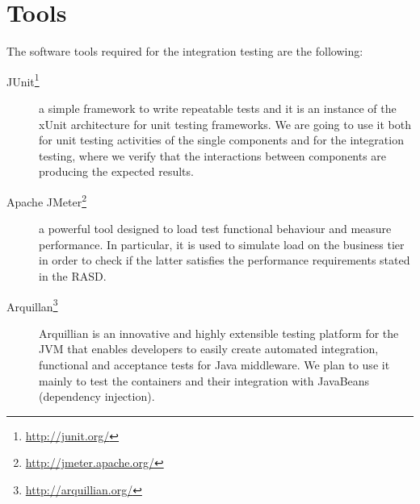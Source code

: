 \section{Tools}
The software tools required for the integration testing are the following:

\begin{description}

    \item[JUnit\footnote{\url{http://junit.org/}}]
    a simple framework to write repeatable tests and it is an instance of the xUnit architecture for unit testing frameworks.
    We are going to use it both for unit testing activities of the single components and for the integration testing, where we verify that the interactions between components are producing the expected results.

    \item[Apache JMeter\footnote{\url{http://jmeter.apache.org/}}]
    a powerful tool designed to load test functional behaviour and measure performance.
    In particular, it is used to simulate load on the business tier in order to check if the latter satisfies the performance requirements stated in the RASD.

	\item[Arquillan\footnote{\url{http://arquillian.org/}}]
    Arquillian is an innovative and highly extensible testing platform for the JVM that enables developers to easily create automated integration, functional and acceptance tests for Java middleware.
    We plan to use it mainly to test the containers and their integration with JavaBeans (dependency
injection).

\end{description}

